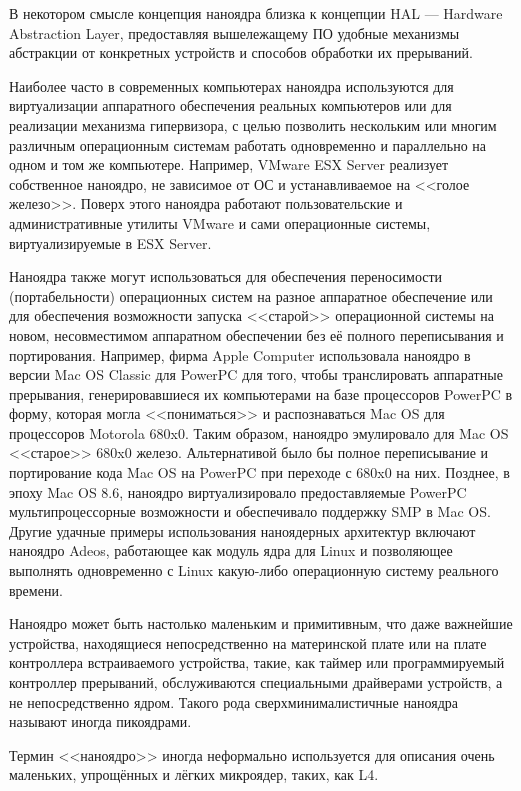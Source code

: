 В некотором смысле концепция наноядра близка к концепции HAL --- Hardware Abstraction Layer, предоставляя вышележащему ПО удобные механизмы абстракции от конкретных устройств и способов обработки их прерываний.

Наиболее часто в современных компьютерах наноядра используются для виртуализации аппаратного обеспечения реальных компьютеров или для реализации механизма гипервизора, с целью позволить нескольким или многим различным операционным системам работать одновременно и параллельно на одном и том же компьютере. Например, VMware ESX Server реализует собственное наноядро, не зависимое от ОС и устанавливаемое на <<голое железо>>. Поверх этого наноядра работают пользовательские и административные утилиты VMware и сами операционные системы, виртуализируемые в ESX Server.

Наноядра также могут использоваться для обеспечения переносимости (портабельности) операционных систем на разное аппаратное обеспечение или для обеспечения возможности запуска <<старой>> операционной системы на новом, несовместимом аппаратном обеспечении без её полного переписывания и портирования. Например, фирма Apple Computer использовала наноядро в версии Mac OS Classic для PowerPC для того, чтобы транслировать аппаратные прерывания, генерировавшиеся их компьютерами на базе процессоров PowerPC в форму, которая могла <<пониматься>> и распознаваться Mac OS для процессоров Motorola 680x0. Таким образом, наноядро эмулировало для Mac OS <<старое>> 680x0 железо. Альтернативой было бы полное переписывание и портирование кода Mac OS на PowerPC при переходе с 680x0 на них. Позднее, в эпоху Mac OS 8.6, наноядро виртуализировало предоставляемые PowerPC мультипроцессорные возможности и обеспечивало поддержку SMP в Mac OS. Другие удачные примеры использования наноядерных архитектур включают наноядро Adeos, работающее как модуль ядра для Linux и позволяющее выполнять одновременно с Linux какую-либо операционную систему реального времени.

Наноядро может быть настолько маленьким и примитивным, что даже важнейшие устройства, находящиеся непосредственно на материнской плате или на плате контроллера встраиваемого устройства, такие, как таймер или программируемый контроллер прерываний, обслуживаются специальными драйверами устройств, а не непосредственно ядром. Такого рода сверхминималистичные наноядра называют иногда пикоядрами.

Термин <<наноядро>> иногда неформально используется для описания очень маленьких, упрощённых и лёгких микроядер, таких, как L4.

